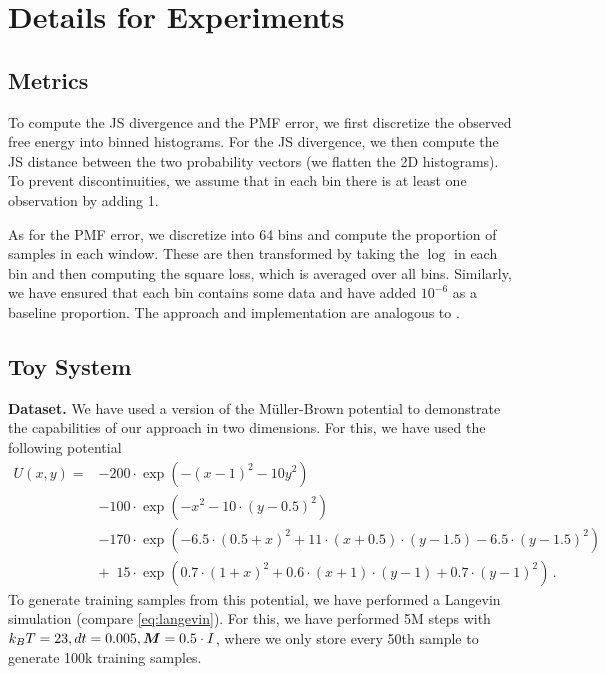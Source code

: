 \section{Details for Experiments} \label{appx:details}
\subsection{Metrics} \label{appx:metrics}
To compute the \gls{JS} divergence and the \gls{PMF} error, we first discretize the observed free energy into binned histograms. For the \gls{JS} divergence, we then compute the \gls{JS} distance between the two probability vectors (we flatten the 2D histograms). To prevent discontinuities, we assume that in each bin there is at least one observation by adding 1. 

As for the \gls{PMF} error, we discretize into 64 bins and compute the proportion of samples in each window. These are then transformed by taking the $\log$ in each bin and then computing the square loss, which is averaged over all bins. Similarly, we have ensured that each bin contains some data and have added $10^{-6}$ as a baseline proportion. 
The approach and implementation are analogous to \cite{durumeric2024learning}.

\subsection{Toy System} \label{appx:mueller-brown-details}
\textbf{Dataset.} We have used a version of the Müller-Brown potential \citep{muellerbrown1979} to demonstrate the capabilities of our approach in two dimensions. For this, we have used the following potential
\begin{equation}
    \begin{aligned}
    U(x, y) = & -200 \cdot \exp \left( -(x-1)^2 -10 y^2 \right) \\
              & -100 \cdot \exp \left( -x^2 - 10 \cdot (y - 0.5)^2 \right) \\
              & -170 \cdot \exp \left( -6.5 \cdot (0.5 + x)^2 + 11 \cdot (x +0.5) \cdot (y -1.5) -6.5 \cdot (y -1.5)^2 \right) \\
              & + \phantom{0}15 \cdot \exp \left( 0.7 \cdot (1 + x)^2 +0.6 \cdot (x + 1) \cdot (y -1) +0.7 \cdot (y -1)^2 \right) \, .
    \end{aligned}
\end{equation}
To generate training samples from this potential, we have performed a Langevin simulation (compare \cref{eq:langevin}). For this, we have performed 5M steps with $k_BT=23, dt=0.005, {\bm{M}} = 0.5 \cdot I$, where we only store every 50th sample to generate 100k training samples.

